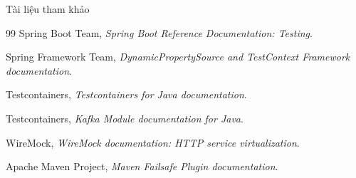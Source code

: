 \documentclass[aspectratio=169,10pt]{beamer}
\begin{document}
\begin{frame}[shrink=1]{Tài liệu tham khảo}
  \begin{thebibliography}{99}
    Spring Boot Team,
    \textit{Spring Boot Reference Documentation: Testing}.

    Spring Framework Team,
    \textit{DynamicPropertySource and TestContext Framework documentation}.

    Testcontainers,
    \textit{Testcontainers for Java documentation}.

    Testcontainers,
    \textit{Kafka Module documentation for Java}.

    WireMock,
    \textit{WireMock documentation: HTTP service virtualization}.

    Apache Maven Project,
    \textit{Maven Failsafe Plugin documentation}.
  \end{thebibliography}
\end{frame}
\end{document}
